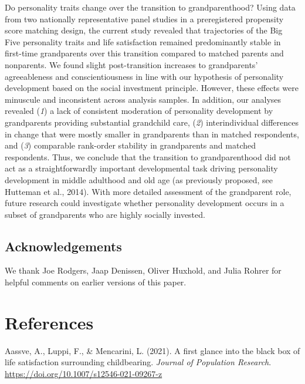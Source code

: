 \documentclass[
  english,
  man,floatsintext]{apa7}
\begin{document}
Do personality traits change over the transition to grandparenthood? Using data from two nationally representative panel studies in a preregistered propensity score matching design, the current study revealed that trajectories of the Big Five personality traits and life satisfaction remained predominantly stable in first-time grandparents over this transition compared to matched parents and nonparents. We found slight post-transition increases to grandparents' agreeableness and conscientiousness in line with our hypothesis of personality development based on the social investment principle. However, these effects were minuscule and inconsistent across analysis samples. In addition, our analyses revealed (\emph{1}) a lack of consistent moderation of personality development by grandparents providing substantial grandchild care, (\emph{2}) interindividual differences in change that were mostly smaller in grandparents than in matched respondents, and (\emph{3}) comparable rank-order stability in grandparents and matched respondents. Thus, we conclude that the transition to grandparenthood did not act as a straightforwardly important developmental task driving personality development in middle adulthood and old age (as previously proposed, see Hutteman et al., 2014). With more detailed assessment of the grandparent role, future research could investigate whether personality development occurs in a subset of grandparents who are highly socially invested.

\hypertarget{acknowledgements}{%
\subsection{Acknowledgements}\label{acknowledgements}}

We thank Joe Rodgers, Jaap Denissen, Oliver Huxhold, and Julia Rohrer for helpful comments on earlier versions of this paper.

\newpage

\hypertarget{references}{%
\section{References}\label{references}}

\begingroup
\setlength{\parindent}{-0.5in}
\setlength{\leftskip}{0.5in}

\hypertarget{refs}{}
\leavevmode\hypertarget{ref-aassveFirstGlanceBlack2021}{}%
Aassve, A., Luppi, F., \& Mencarini, L. (2021). A first glance into the black box of life satisfaction surrounding childbearing. \emph{Journal of Population Research}. \url{https://doi.org/10.1007/s12546-021-09267-z}
\end{document}

